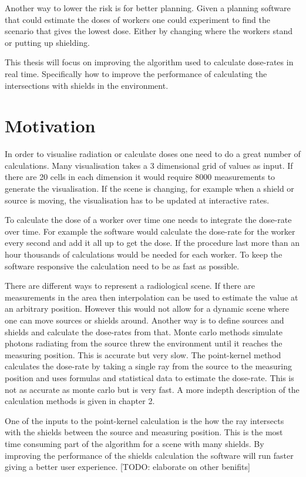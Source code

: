 \documentclass[11pt,twoside,a4paper]{report}
\begin{document}
Another way to lower the risk is for better planning. Given a planning software that could estimate the doses of workers one could experiment to find the scenario that gives the lowest dose. Either by changing where the workers stand or putting up shielding.

This thesis will focus on improving the algorithm used to calculate dose-rates in real time. Specifically how to improve the performance of calculating the intersections with shields in the environment.


\section{Motivation}
In order to visualise radiation or calculate doses one need to do a great number of calculations. Many visualisation takes a 3 dimensional grid of values as input. If there are 20 cells in each dimension it would require 8000 measurements to generate the visualisation. If the scene is changing, for example when a shield or source is moving, the visualisation has to be updated at interactive rates. 

To calculate the dose of a worker over time one needs to integrate the dose-rate over time. For example the software would calculate the dose-rate for the worker every second and add it all up to get the dose. If the procedure last more than an hour thousands of calculations would be needed for each worker. To keep the software responsive the calculation need to be as fast as possible.

There are different ways to represent a radiological scene. If there are measurements in the area then interpolation can be used to estimate the value at an arbitrary position. However this would not allow for a dynamic scene where one can move sources or shields around. Another way is to define sources and shields and calculate the dose-rates from that. Monte carlo methods simulate photons radiating from the source threw the environment until it reaches the measuring position. This is accurate but very slow. The point-kernel method calculates the dose-rate by taking a single ray from the source to the measuring position and uses formulas and statistical data to estimate the dose-rate. This is not as accurate as monte carlo but is very fast. A more indepth description of the calculation methods is given in chapter 2.

One of the inputs to the point-kernel calculation is the how the ray intersects with the shields between the source and measuring position. This is the most time consuming part of the algorithm for a scene with many shields. By improving the performance of the shields calculation the software will run faster giving a better user experience. [TODO: elaborate on other benifits]
\end{document}
